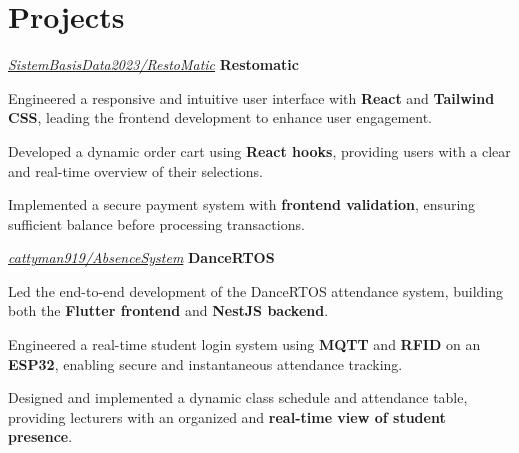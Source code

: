 \documentclass[../main.tex]{subfiles}
\begin{document}
\section{Projects}

\begin{twocolentry}{
    \small
    \textit{\href{https://github.com/SistemBasisData2023/RestoMatic}{SistemBasisData2023/RestoMatic}}
}
    \textbf{Restomatic}
\end{twocolentry}

\vspace{0.10 cm}
\begin{onecolentry}
\begin{highlights}
    \item Engineered a responsive and intuitive user interface with \textbf{React} and \textbf{Tailwind CSS}, leading the frontend development to enhance user engagement.
    \item Developed a dynamic order cart using \textbf{React hooks}, providing users with a clear and real-time overview of their selections.
    \item Implemented a secure payment system with \textbf{frontend validation}, ensuring sufficient balance before processing transactions.
\end{highlights}
\end{onecolentry}

\vspace{0.2 cm}

\begin{twocolentry}{
    \small
    \textit{\href{https://github.com/cattyman919/AbsenceSystem}{cattyman919/AbsenceSystem}}
}
    \textbf{DanceRTOS}
\end{twocolentry}

\vspace{0.10 cm}
\begin{onecolentry}
\begin{highlights}
    \item Led the end-to-end development of the DanceRTOS attendance system, building both the \textbf{Flutter frontend} and \textbf{NestJS backend}.
    \item Engineered a real-time student login system using \textbf{MQTT} and \textbf{RFID} on an \textbf{ESP32}, enabling secure and instantaneous attendance tracking.
    \item Designed and implemented a dynamic class schedule and attendance table, providing lecturers with an organized and \textbf{real-time view of student presence}.
\end{highlights}
\end{onecolentry}
\end{document}

